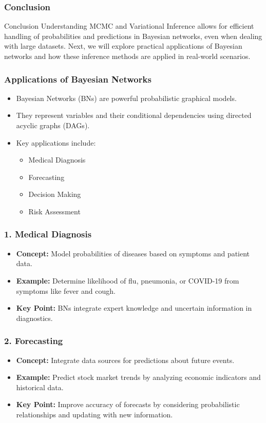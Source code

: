 \documentclass[aspectratio=169]{beamer}
\begin{document}
\begin{frame}[fragile]
    \frametitle{Conclusion}
    
    \begin{block}{Conclusion}
        Understanding MCMC and Variational Inference allows for efficient handling of probabilities and predictions in Bayesian networks, even when dealing with large datasets. Next, we will explore practical applications of Bayesian networks and how these inference methods are applied in real-world scenarios.
    \end{block}
\end{frame}

\begin{frame}[fragile]
    \frametitle{Applications of Bayesian Networks}
    \begin{itemize}
        \item Bayesian Networks (BNs) are powerful probabilistic graphical models.
        \item They represent variables and their conditional dependencies using directed acyclic graphs (DAGs).
        \item Key applications include:
        \begin{itemize}
            \item Medical Diagnosis
            \item Forecasting
            \item Decision Making
            \item Risk Assessment
        \end{itemize}
    \end{itemize}
\end{frame}

\begin{frame}[fragile]
    \frametitle{1. Medical Diagnosis}
    \begin{itemize}
        \item \textbf{Concept:} Model probabilities of diseases based on symptoms and patient data.
        \item \textbf{Example:} Determine likelihood of flu, pneumonia, or COVID-19 from symptoms like fever and cough.
        \item \textbf{Key Point:} BNs integrate expert knowledge and uncertain information in diagnostics.
    \end{itemize}
\end{frame}

\begin{frame}[fragile]
    \frametitle{2. Forecasting}
    \begin{itemize}
        \item \textbf{Concept:} Integrate data sources for predictions about future events.
        \item \textbf{Example:} Predict stock market trends by analyzing economic indicators and historical data.
        \item \textbf{Key Point:} Improve accuracy of forecasts by considering probabilistic relationships and updating with new information.
    \end{itemize}
\end{frame}
\end{document}
